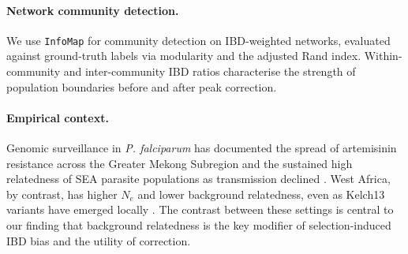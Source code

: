 \paragraph{Network community detection.} We use \texttt{InfoMap} \citep{rosvall2008maps} for community detection on IBD-weighted networks, evaluated against ground-truth labels via modularity \citep{newman2004modularity} and the adjusted Rand index. Within-community and inter-community IBD ratios characterise the strength of population boundaries before and after peak correction.

\paragraph{Empirical context.} Genomic surveillance in \textit{P. falciparum} has documented the spread of artemisinin resistance across the Greater Mekong Subregion \citep{ashley2014tracking,miotto2015genetic} and the sustained high relatedness of SEA parasite populations as transmission declined \citep{amato2017piperaquine}. West Africa, by contrast, has higher $N_e$ and lower background relatedness, even as Kelch13 variants have emerged locally \citep{verity2020diversity}. The contrast between these settings is central to our finding that background relatedness is the key modifier of selection-induced IBD bias and the utility of correction.
